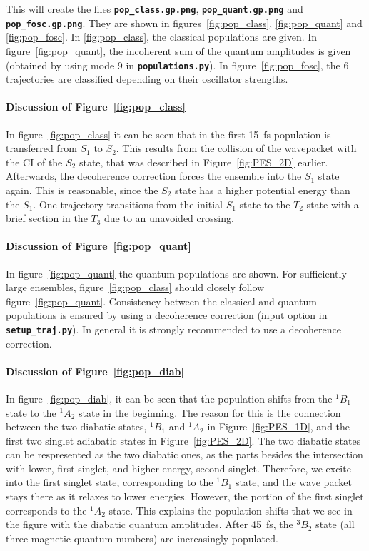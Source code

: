 \documentclass[a4paper,11pt,DIV=15,openany]{scrbook}
\newcommand{\ttt}[1]{\textbf{\texttt{#1}}}
\begin{document}
This will create the files \ttt{pop\_class.gp.png}, \ttt{pop\_quant.gp.png} and \ttt{pop\_fosc.gp.png}. They are shown in figures~\ref{fig:pop_class}, \ref{fig:pop_quant} and \ref{fig:pop_fosc}. 
In \ref{fig:pop_class}, the classical populations are given. 
In figure~\ref{fig:pop_quant}, the incoherent sum of the quantum amplitudes is given (obtained by using mode 9 in \ttt{populations.py}).
In figure~\ref{fig:pop_fosc}, the 6 trajectories are classified depending on their oscillator strengths.



\paragraph{Discussion of Figure~\ref{fig:pop_class}}

In figure~\ref{fig:pop_class} it can be seen that in the first 15~fs population is transferred from $S_1$ to $S_2$.
This results from the collision of the wavepacket with the CI of the $S_2$ state, that was described in Figure~\ref{fig:PES_2D} earlier.
Afterwards, the decoherence correction forces the ensemble into the $S_1$ state again.
This is reasonable, since the $S_2$ state has a higher potential energy than the $S_1$. 
One trajectory transitions from the initial $S_1$ state to the $T_2$ state with a brief section in the $T_3$ due to an unavoided crossing.

\paragraph{Discussion of Figure~\ref{fig:pop_quant}}

In figure~\ref{fig:pop_quant} the quantum populations are shown. For sufficiently large ensembles, figure~\ref{fig:pop_class} should closely follow figure~\ref{fig:pop_quant}. Consistency between the classical and quantum populations is ensured by using a decoherence correction (input option in \ttt{setup\_traj.py}). In general it is strongly recommended to use a decoherence correction.

\paragraph{Discussion of Figure~\ref{fig:pop_diab}}

In figure~\ref{fig:pop_diab}, it can be seen that the population shifts from the ${}^1B_1$ state to the ${}^1A_2$ state in the beginning. 
The reason for this is the connection between the two diabatic states, ${}^1B_1$ and ${}^1A_2$ in Figure~\ref{fig:PES_1D}, and the first two singlet adiabatic states in Figure~\ref{fig:PES_2D}.
The two diabatic states can be respresented as the two diabatic ones, as the parts besides the intersection with lower, first singlet, and higher energy, second singlet. 
Therefore, we excite into the first singlet state, corresponding to the ${}^1B_1$ state, and the wave packet stays there as it relaxes to lower energies.
However, the portion of the first singlet corresponds to the ${}^1A_2$ state.
This explains the population shifts that we see in the figure with the diabatic quantum amplitudes.
After 45~fs, the ${}^3B_2$ state (all three magnetic quantum numbers) are increasingly populated.
\end{document}
